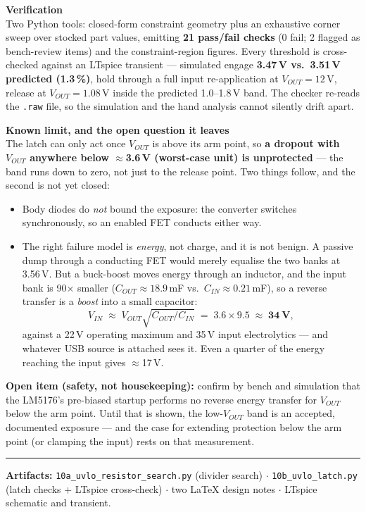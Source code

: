 \documentclass[10pt]{article}
\newcommand{\hd}[1]{\vspace{2pt}\textbf{\large #1}\vspace{1pt}\\}
\begin{document}
\hd{Verification}
Two Python tools: closed-form constraint geometry plus an exhaustive corner
sweep over stocked part values, emitting \textbf{21 pass/fail checks} (0 fail;
2 flagged as bench-review items) and the constraint-region figures. Every
threshold is cross-checked against an LTspice transient --- simulated engage
\textbf{3.47\,V vs.\ 3.51\,V predicted (1.3\,\%)}, hold through a full input
re-application at $V_{OUT}=12$\,V, release at $V_{OUT}=1.08$\,V inside the
predicted 1.0--1.8\,V band. The checker re-reads the \texttt{.raw} file, so the
simulation and the hand analysis cannot silently drift apart.

\hd{Known limit, and the open question it leaves}
The latch can only act once $V_{OUT}$ is above its arm point, so \textbf{a
dropout with $V_{OUT}$ anywhere below $\approx$3.6\,V (worst-case unit) is
unprotected} --- the band runs down to zero, not just to the release point.
Two things follow, and the second is not yet closed:
\begin{itemize}[leftmargin=1.1em,itemsep=2pt,topsep=1pt]
\item Body diodes do \emph{not} bound the exposure: the converter switches
  synchronously, so an enabled FET conducts either way.
\item The right failure model is \emph{energy}, not charge, and it is not
  benign. A passive dump through a conducting FET would merely equalise the two
  banks at 3.56\,V. But a buck-boost moves energy through an inductor, and the
  input bank is 90$\times$ smaller ($C_{OUT}\approx18.9$\,mF vs.\
  $C_{IN}\approx0.21$\,mF), so a reverse transfer is a \emph{boost} into a
  small capacitor:
  \[
  V_{IN}\;\approx\;V_{OUT}\sqrt{C_{OUT}/C_{IN}}\;=\;3.6\times9.5\;\approx\;
  \mathbf{34\ V},
  \]
  against a 22\,V operating maximum and 35\,V input electrolytics --- and
  whatever USB source is attached sees it. Even a quarter of the energy
  reaching the input gives $\approx$17\,V.
\end{itemize}
\vspace{-3pt}
\textbf{Open item (safety, not housekeeping):} confirm by bench and simulation
that the LM5176's pre-biased startup performs no reverse energy transfer for
$V_{OUT}$ below the arm point. Until that is shown, the low-$V_{OUT}$ band is
an accepted, documented exposure --- and the case for extending protection
below the arm point (or clamping the input) rests on that measurement.

\vspace{3pt}\hrule\vspace{3pt}
{\small\textbf{Artifacts:} \texttt{10a\_uvlo\_resistor\_search.py} (divider
search) $\cdot$ \texttt{10b\_uvlo\_latch.py} (latch checks + LTspice
cross-check) $\cdot$ two LaTeX design notes $\cdot$ LTspice schematic and
transient.}
\end{document}
